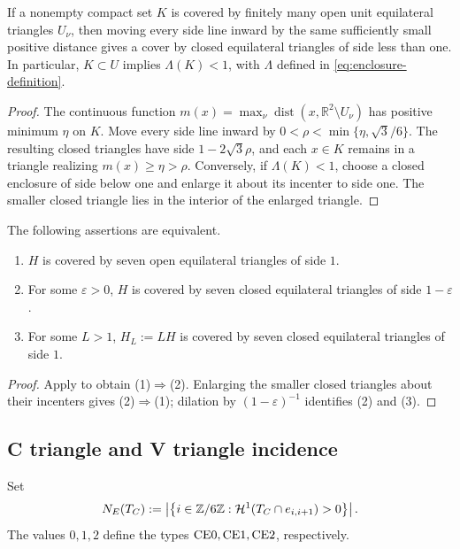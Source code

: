 \begin{lemma}
\label{lem:compact-cover-margin}
If a nonempty compact set $K$ is covered by finitely many open unit equilateral
triangles $U_\nu$, then moving every side line inward by the same sufficiently
small positive distance gives a cover by closed equilateral triangles of
side less than one. In particular, $K\subset U$ implies $\Lambda(K)<1$,
with $\Lambda$ defined in \eqref{eq:enclosure-definition}.
\end{lemma}
\begin{proof}
The continuous function
$m(x)=\max_\nu\operatorname{dist}(x,\mathbb R^2\setminus U_\nu)$
has positive minimum $\eta$ on $K$. Move every side line inward by
$0<\rho<\min\{\eta,\sqrt3/6\}$. The resulting closed triangles have
side $1-2\sqrt3\rho$, and each $x\in K$ remains in a triangle realizing
$m(x)\ge\eta>\rho$. Conversely, if $\Lambda(K)<1$, choose a closed
enclosure of side below one and enlarge it about its incenter to side one.
The smaller closed triangle lies in the interior of the enlarged triangle.
\end{proof}

\begin{proposition}
\label{prop:open-closed-scaled}
The following assertions are equivalent.
\begin{enumerate}
 \item $H$ is covered by seven open equilateral triangles of side $1$.
 \item For some $\varepsilon>0$, $H$ is covered by seven closed equilateral
 triangles of side $1-\varepsilon$.
 \item For some $L>1$, $H_L:=LH$ is covered by seven closed equilateral
 triangles of side $1$.
\end{enumerate}
\end{proposition}

\begin{proof}
Apply  to obtain (1)$\Rightarrow$(2).
Enlarging the smaller closed triangles about their incenters gives
(2)$\Rightarrow$(1); dilation by $(1-\varepsilon)^{-1}$ identifies
(2) and (3).
\end{proof}

\subsection{C triangle and V triangle incidence}

Set
\[
 N_E(T_C):=
 \left\lvert\left\{i\in\mathbb Z/6\mathbb Z:
 \mathcal H^1(T_C\cap e_{i,i+1})>0\right\}\right\rvert.
\]
The values $0,1,2$ define the types $\mathrm{CE0},\mathrm{CE1},\mathrm{CE2}$, respectively.

